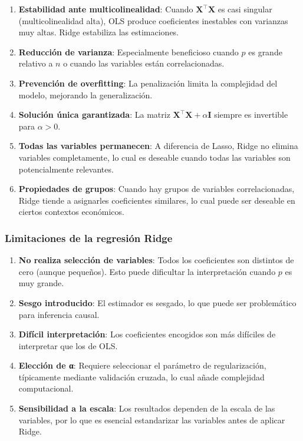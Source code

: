 \documentclass[
  doc,
  floatsintext,
  longtable,
  a4paper,
  nolmodern,
  notxfonts,
  notimes,
  12pt,
  colorlinks=true,linkcolor=blue,citecolor=blue,urlcolor=blue]{apa7}
\begin{document}
\begin{enumerate}
\def\labelenumi{\arabic{enumi}.}
\item
  \textbf{Estabilidad ante multicolinealidad}: Cuando
  \(\mathbf{X}^\top\mathbf{X}\) es casi singular (multicolinealidad
  alta), OLS produce coeficientes inestables con varianzas muy altas.
  Ridge estabiliza las estimaciones.
\item
  \textbf{Reducción de varianza}: Especialmente beneficioso cuando \(p\)
  es grande relativo a \(n\) o cuando las variables están
  correlacionadas.
\item
  \textbf{Prevención de overfitting}: La penalización limita la
  complejidad del modelo, mejorando la generalización.
\item
  \textbf{Solución única garantizada}: La matriz
  \(\mathbf{X}^\top\mathbf{X} + \alpha\mathbf{I}\) siempre es invertible
  para \(\alpha > 0\).
\item
  \textbf{Todas las variables permanecen}: A diferencia de Lasso, Ridge
  no elimina variables completamente, lo cual es deseable cuando todas
  las variables son potencialmente relevantes.
\item
  \textbf{Propiedades de grupos}: Cuando hay grupos de variables
  correlacionadas, Ridge tiende a asignarles coeficientes similares, lo
  cual puede ser deseable en ciertos contextos económicos.
\end{enumerate}

\subsubsection{Limitaciones de la regresión
Ridge}\label{limitaciones-de-la-regresiuxf3n-ridge}

\begin{enumerate}
\def\labelenumi{\arabic{enumi}.}
\item
  \textbf{No realiza selección de variables}: Todos los coeficientes son
  distintos de cero (aunque pequeños). Esto puede dificultar la
  interpretación cuando \(p\) es muy grande.
\item
  \textbf{Sesgo introducido}: El estimador es sesgado, lo que puede ser
  problemático para inferencia causal.
\item
  \textbf{Difícil interpretación}: Los coeficientes encogidos son más
  difíciles de interpretar que los de OLS.
\item
  \textbf{Elección de α}: Requiere seleccionar el parámetro de
  regularización, típicamente mediante validación cruzada, lo cual añade
  complejidad computacional.
\item
  \textbf{Sensibilidad a la escala}: Los resultados dependen de la
  escala de las variables, por lo que es esencial estandarizar las
  variables antes de aplicar Ridge.
\end{enumerate}
\end{document}
